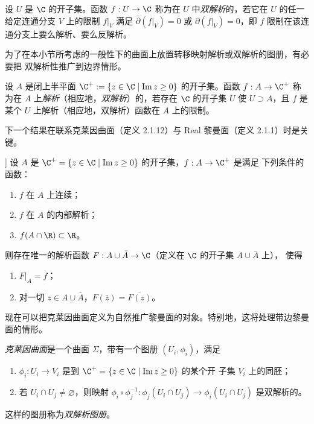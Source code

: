 \begin{definition}\label{def:2.1.9}
设 $U$ 是 $\C$ 的开子集。函数 $f:U\to\C$ 称为在 $U$ 中\emph{双解析}的，若它在 $U$
的任一给定连通分支 $V$ 上的限制 $f|_V$ 满足 $\bar\partial(f|_V)=0$ 或
$\partial(f|_V)=0$，即 $f$ 限制在该连通分支上要么解析、要么反解析。
\end{definition}

为了在本小节所考虑的一般性下的曲面上放置转移映射解析或双解析的图册，有必要把
双解析性推广到边界情形。

\begin{definition}\label{def:2.1.10}
设 $A$ 是闭上半平面 $\C^+:=\{z\in\C\mid\operatorname{Im}z\ge0\}$ 的开子集。函数
$f:A\to\C^+$ 称为在 $A$ 上\emph{解析}（相应地，\emph{双解析}）的，若存在 $\C$ 的开子集
$U$ 使 $U\supset A$，且 $f$ 是某个 $U$ 上解析（相应地，双解析）函数在 $A$ 上的限制。
\end{definition}

下一个结果在联系克莱因曲面（定义 2.1.12）与 Real 黎曼面（定义 2.1.1）时是关键。

\begin{theorem}[Schwarz 反射原理，参看 [3]]\label{thm:2.1.11}
设 $A$ 是 $\C^+=\{z\in\C\mid\operatorname{Im}z\ge0\}$ 的开子集，$f:A\to\C^+$ 是满足
下列条件的函数：
\begin{enumerate}[label=(\roman*), leftmargin=2.2em, itemsep=0.15em]
\item $f$ 在 $A$ 上连续；
\item $f$ 在 $A$ 的内部解析；
\item $f(A\cap\R)\subset\R$。
\end{enumerate}
则存在唯一的解析函数 $F:A\cup\bar A\to\C$（定义在 $\C$ 的开子集 $A\cup\bar A$ 上），
使得
\begin{enumerate}[label=(\roman*), resume, leftmargin=2.2em, itemsep=0.15em]
\item $F|_A=f$；
\item 对一切 $z\in A\cup\bar A$，$F(\bar z)=\overline{F(z)}$。
\end{enumerate}
\end{theorem}

现在可以把克莱因曲面定义为自然推广黎曼面的对象。特别地，这将处理带边黎曼面的情形。

\begin{definition}[克莱因曲面]\label{def:2.1.12}
\emph{克莱因曲面}是一个曲面 $\Sigma$，带有一个图册 $(U_i,\phi_i)$，满足
\begin{enumerate}[label=(\roman*), leftmargin=2.2em, itemsep=0.15em]
\item $\phi_i:U_i\to V_i$ 是到 $\C^+=\{z\in\C\mid\operatorname{Im}z\ge0\}$ 的某个开
      子集 $V_i$ 上的同胚；
\item 若 $U_i\cap U_j\neq\varnothing$，则映射
      $\phi_i\circ\phi_j^{-1}:\phi_j(U_i\cap U_j)\to\phi_i(U_i\cap U_j)$ 是双解析的。
\end{enumerate}
这样的图册称为\emph{双解析图册}。
\end{definition}

